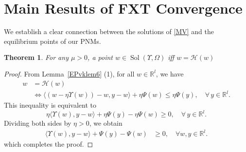 \documentclass{article}
\theoremstyle{plain}%
\newtheorem{theorem}{Theorem}[section]
\theoremstyle{thmstyletwo}%
\theoremstyle{thmstylethree}%
\begin{document}
\section{Main Results of FXT Convergence}
We establish a clear connection between the solutions of  \eqref{MV} and the equilibrium points of our PNMs.
\begin{theorem}\label{ThE1}
For any \(\mu> 0\), a point \(w \in\operatorname{Sol}(\Upsilon, \Omega)\)
iff  
$w=\mathcal{H}(w)$
\end{theorem}
\begin{proof}
From Lemma~\ref{EPvklem6} (1), for all $w\in \mathbb{R}^l$, we have
\begin{equation*}
    \begin{split}
        w&= \mathcal{H}(w)\\
&\iff
\langle (w - \eta \Upsilon(w)) -w, y - w \rangle+ \eta \Psi(w) \le \eta \Psi(y),
\quad \forall\, y \in \mathbb{R}^l.
    \end{split}
\end{equation*}
This inequality is equivalent to
\[
\eta \langle \Upsilon(w), y - w \rangle+ \eta \Psi(y) - \eta \Psi(w) \ge 0,
\quad \forall\, y \in \mathbb{R}^l.
\]
Dividing both sides by $\eta > 0$, we obtain
\begin{equation*}
    \begin{split}
        \langle \Upsilon(w), y - w \rangle+ \Psi(y) - \Psi(w) &\ge 0,
\quad \forall w, y \in \mathbb{R}^l.
\end{split}
\end{equation*}
which completes the proof.
\end{proof}
\end{document}
